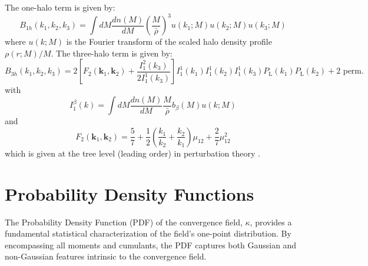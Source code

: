 The one-halo term is given by:
\begin{equation}
    B_{1h}\left(k_1, k_2, k_3\right)=\int d M \frac{d n(M)}{d M}\left(\frac{M}{\bar{\rho}}\right)^3 u\left(k_1 ; M\right) u\left(k_2 ; M\right) u\left(k_3 ; M\right)
    \label{eq:bihalofit_1h}
\end{equation}
where \( u(k; M) \) is the Fourier transform of the scaled halo density profile $\rho(r; M)/M$. The three-halo term is given by:
\begin{equation}
    B_{3h}\left(k_1, k_2, k_3\right)=2\left[F_2\left(\boldsymbol{k}_1, \boldsymbol{k}_2\right)+\frac{I_1^2\left(k_3\right)}{2 I_1^1\left(k_3\right)}\right] I_1^1\left(k_1\right) I_1^1\left(k_2\right) I_1^1\left(k_3\right) P_{\mathrm{L}}\left(k_1\right) P_{\mathrm{L}}\left(k_2\right)+2 \text { perm. }
    \label{eq:bihalofit_3h}
\end{equation}
with 
\begin{equation}
    I_1^\beta(k)=\int d M \frac{d n(M)}{d M} \frac{M}{\bar{\rho}} b_\beta(M) u(k ; M)
    \label{eq:bihalofit_3h_integral}
\end{equation}
and
\begin{equation}
    F_2\left(\boldsymbol{k}_1, \boldsymbol{k}_2\right)=\frac{5}{7}+\frac{1}{2}\left(\frac{k_1}{k_2}+\frac{k_2}{k_1}\right) \mu_{12}+\frac{2}{7} \mu_{12}^2
    \label{eq:bihalofit_3h_F2}
\end{equation}
which is given at the tree level (leading order) in perturbation theory \citep{2002PhR...367....1B}.

\section{Probability Density Functions} \label{sec:pdfs}
The Probability Density Function (PDF) of the convergence field, $\kappa$, provides a fundamental statistical characterization of the field's one-point distribution. By encompassing all moments and cumulants, the PDF captures both Gaussian and non-Gaussian features intrinsic to the convergence field.

